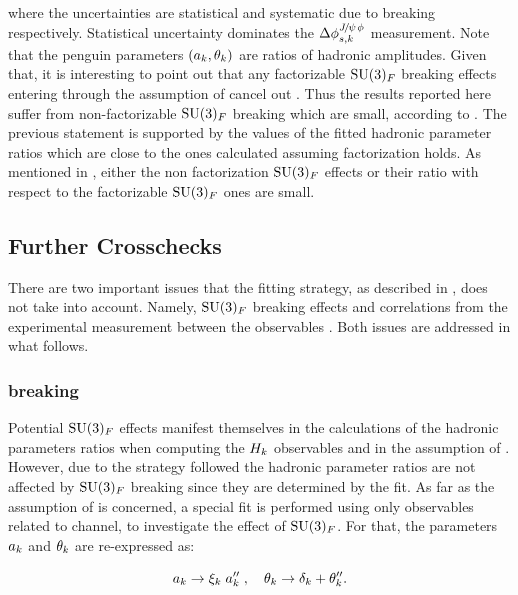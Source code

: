 \noindent where the uncertainties are statistical and systematic due to \grpsuthree breaking respectively.
Statistical uncertainty dominates the $\Delta\phi^{{J\mskip -3mu/\mskip -2mu\psi\mskip 2mu}\phi}_{s,{k}}$ measurement.
Note that the penguin parameters $(a_k,\theta_k)$ are ratios of hadronic amplitudes.
Given that, it is interesting to point out that any factorizable $\mathrm{SU}(3)_F$ breaking
effects entering through the assumption of  cancel out \cite{Fleischer:1999zi}.
Thus the results reported here suffer from non-factorizable $\mathrm{SU}(3)_F$ breaking which are small,
according to \cite{DeBruyn:2014oga,DeBruyn-thesis}. The previous statement is supported by the values of the fitted hadronic parameter
ratios which are close to the ones calculated assuming factorization holds. As mentioned in \cite{DeBruyn:2014oga,DeBruyn-thesis},
either the non factorization $\mathrm{SU}(3)_F$ effects or their ratio with respect to the factorizable $\mathrm{SU}(3)_F$
ones are small.

\subsection{Further Crosschecks}
There are two important issues that the fitting strategy, as described in ,
does not take into account. Namely, $\mathrm{SU}(3)_F$ breaking effects and correlations from the
experimental measurement between the observables . Both issues are addressed in what follows.

\subsubsection{\grpsuthree breaking}
\label{su3_breaking}
Potential $\mathrm{SU}(3)_F$ effects manifest themselves in the calculations of the hadronic parameters ratios
when computing the $H_{k}$ observables and in the assumption of . However, due to the
strategy followed the hadronic parameter ratios are not affected by $\mathrm{SU}(3)_F$ breaking since they
are determined by the fit. As far as the assumption of  is concerned, a special fit is
performed using only observables related to \BdJpsiRho channel, to investigate the effect of $\mathrm{SU}(3)_F$.
For that, the parameters $a_k$ and $\theta_k$ are re-expressed as:

\begin{equation}
  \centering
  \akPeng \to \xi_k \; \akPeng'' \;, \quad \thkPeng \to \delta_k + \thkPeng''.
\label{su3_breaking_invoke}
\end{equation}

